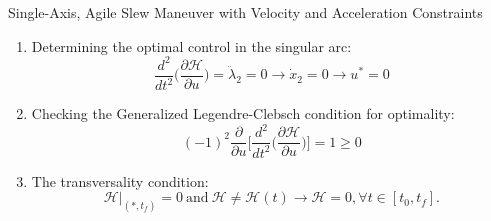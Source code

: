 \documentclass{beamer}
\newcounter{saveenumi}
\newcommand{\seti}{\setcounter{saveenumi}{\value{enumi}}}
\newcommand{\conti}{\setcounter{enumi}{\value{saveenumi}}}
\begin{document}
\begin{frame}
\begin{block}{ Single-Axis, Agile Slew Maneuver with Velocity and Acceleration Constraints}
\begin{enumerate}
\conti
\item Determining the optimal control in the singular arc:
\begin{equation}
\frac{d^2}{dt^2}\Big(\frac{\partial \mathscr{H}}{\partial u}\Big)=\ddot{\lambda}_2=0\rightarrow \dot{x}_2=0\rightarrow u^*=0
\end{equation}
\item Checking the Generalized Legendre-Clebsch condition for optimality:
\begin{equation}
(-1)^2\frac{\partial}{\partial u}\Big[\frac{d^2}{dt^2}\Big(\frac{\partial \mathscr{H}}{\partial u}\Big)\Big]=1\geq 0
\end{equation}
\item The transversality condition:
\begin{equation}
\mathscr{H}|_{(*,t_f)}=0\  \text{and} \ \mathscr{H}\neq\mathscr{H}(t)\rightarrow \mathscr{H}=0, \forall t\in[t_0, t_f].
\end{equation}
\end{enumerate}
\seti
\end{block}
\end{frame}
\end{document}
